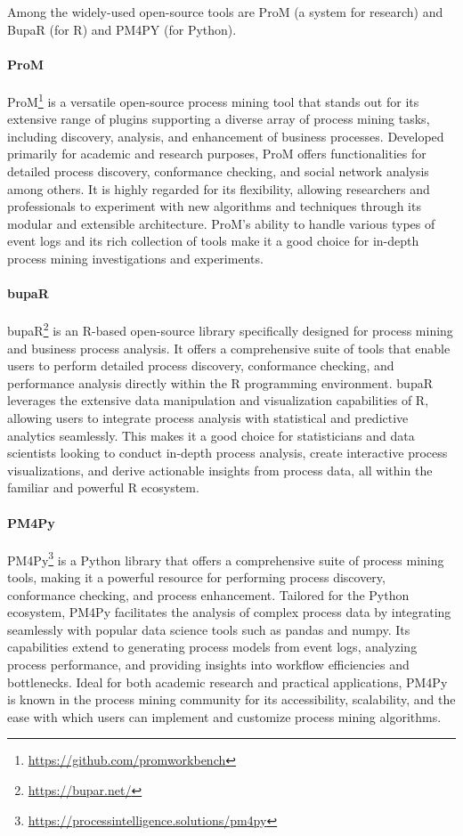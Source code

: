 Among the widely-used open-source tools are ProM (a system for research) and BupaR (for R) and PM4PY (for Python).

\paragraph*{ProM}
ProM\footnote{\url{https://github.com/promworkbench}} is a versatile open-source process mining tool that stands out for its extensive range of plugins supporting a diverse array of process mining tasks, including discovery, analysis, and enhancement of business processes. Developed primarily for academic and research purposes, ProM offers functionalities for detailed process discovery, conformance checking, and social network analysis among others. It is highly regarded for its flexibility, allowing researchers and professionals to experiment with new algorithms and techniques through its modular and extensible architecture. ProM's ability to handle various types of event logs and its rich collection of tools make it a good choice for in-depth process mining investigations and experiments.

\paragraph*{bupaR}
bupaR\footnote{\url{https://bupar.net/}} is an R-based open-source library specifically designed for process mining and business process analysis. It offers a comprehensive suite of tools that enable users to perform detailed process discovery, conformance checking, and performance analysis directly within the R programming environment. bupaR leverages the extensive data manipulation and visualization capabilities of R, allowing users to integrate process analysis with statistical and predictive analytics seamlessly. This makes it a good choice for statisticians and data scientists looking to conduct in-depth process analysis, create interactive process visualizations, and derive actionable insights from process data, all within the familiar and powerful R ecosystem.

\paragraph*{PM4Py}
PM4Py\footnote{\url{https://processintelligence.solutions/pm4py}} is a Python library that offers a comprehensive suite of process mining tools, making it a powerful resource for performing process discovery, conformance checking, and process enhancement. Tailored for the Python ecosystem, PM4Py facilitates the analysis of complex process data by integrating seamlessly with popular data science tools such as pandas and numpy. Its capabilities extend to generating process models from event logs, analyzing process performance, and providing insights into workflow efficiencies and bottlenecks. Ideal for both academic research and practical applications, PM4Py is known in the process mining community for its accessibility, scalability, and the ease with which users can implement and customize process mining algorithms.

